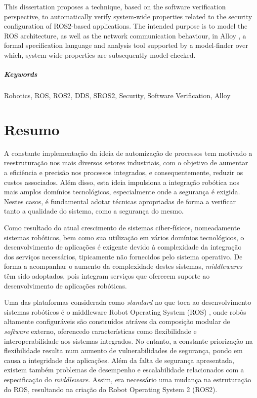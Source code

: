\documentclass[
  oneside,
  11pt, a4paper,
  footinclude=true,
  headinclude=true,
  cleardoublepage=empty
]{scrbook}
\begin{document}
	This dissertation proposes a technique, based on the software verification perspective, to automatically verify system-wide properties related to the security configuration of ROS2-based applications. The intended purpose is to model the ROS architecture, as well as the network communication behaviour, in Alloy \cite{alloy-6}, a formal specification language and analysis tool supported by a model-finder over which, system-wide properties are subsequently model-checked.

\paragraph{Keywords} Robotics, ROS, ROS2, DDS, SROS2, Security, Software Verification, Alloy
	\cleardoublepage

\chapter*{Resumo}

	A constante implementação da ideia de automização de processos tem motivado a reestruturação nos mais diversos setores industriais, com o objetivo de aumentar a eficiência e precisão nos processos integrados, e consequentemente, reduzir os custos associados. Além disso, esta ideia impulsiona a integração robótica nos mais amplos domínios tecnológicos, especialmente onde a segurança é exigida. Nestes casos, é fundamental adotar técnicas apropriadas de forma a verificar tanto a qualidade do sistema, como a segurança do mesmo.

	Como resultado do atual crescimento de sistemas ciber-físicos, nomeadamente sistemas robóticos, bem como sua utilização em vários domínios tecnológicos, o desenvolvimento de aplicações é exigente devido à complexidade da integração dos serviços necessários, tipicamente não fornecidos pelo sistema operativo. De forma a acompanhar o aumento da complexidade destes sistemas, \textit{middlewares} têm sido adoptados, pois integram serviços que oferecem suporte ao desenvolvimento de aplicações robóticas.

	Uma das plataformas considerada como \textit{standard} no que toca ao desenvolvimento sistemas robóticos é o middleware Robot Operating System (ROS) \cite{1}, onde robôs altamente configuráveis são construídos atráves da composição modular de \textit{software} externo, oferencedo características como flexibilidade e interoperabilidade aos sistemas integrados. No entanto, a constante priorização na flexibilidade resulta num aumento de vulnerabilidades de segurança, pondo em causa a integridade das aplicações. Além da falta de segurança apresentada, existem também problemas de desempenho e escalabilidade relacionados com a especificação do \textit{middleware}. Assim, era necessário uma mudança na estruturação do ROS, resultando na criação do Robot Operating System 2 (ROS2).
\end{document}

